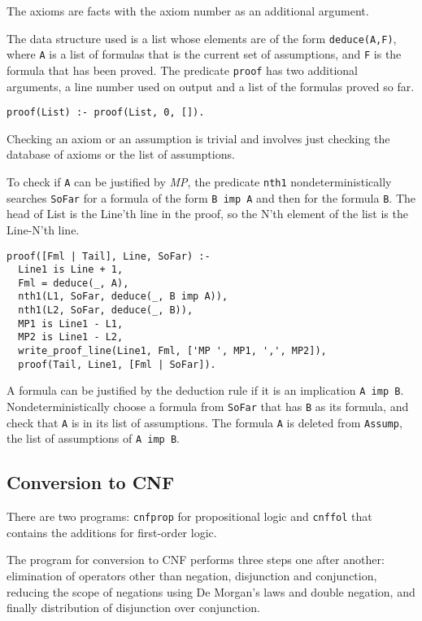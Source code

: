 \documentclass[11pt]{article}
\newcommand*{\p}[1]{\textup{\texttt{#1}}}
\begin{document}
The axioms are facts with the axiom number as an additional argument.

The data structure used is a list whose elements are of the form
\p{deduce(A,F)}, where \p{A} is a list of formulas that is the current
set of assumptions, and \p{F} is the formula that has been proved. The
predicate \p{proof} has two additional arguments, a line number used on
output and a list of the formulas proved so far.

\begin{verbatim}
proof(List) :- proof(List, 0, []).
\end{verbatim}

Checking an axiom or an assumption is trivial and involves just checking
the database of axioms or the list of assumptions.

To check if \p{A} can be justified by \emph{MP}, the predicate \p{nth1}
nondeterministically searches \p{SoFar} for a formula of the form \p{B
imp A} and then for the formula \p{B}. The head of List is the Line'th
line in the proof, so the N'th element of the list is the Line-N'th
line.

\begin{verbatim}
proof([Fml | Tail], Line, SoFar) :- 
  Line1 is Line + 1,
  Fml = deduce(_, A),
  nth1(L1, SoFar, deduce(_, B imp A)), 
  nth1(L2, SoFar, deduce(_, B)),
  MP1 is Line1 - L1,
  MP2 is Line1 - L2,
  write_proof_line(Line1, Fml, ['MP ', MP1, ',', MP2]),
  proof(Tail, Line1, [Fml | SoFar]).
\end{verbatim}

A formula can be justified by the deduction rule if it is an implication
\p{A imp B}. Nondeterministically choose a formula from \p{SoFar} that
has \p{B} as its formula, and check that \p{A} is in its list of
assumptions. The formula \p{A} is deleted from \p{Assump}, the list of
assumptions of \p{A imp B}.



\subsection{Conversion to CNF}\label{s.cnf}

There are two programs: \p{cnfprop} for propositional logic and
\p{cnffol} that contains the additions for first-order logic.

The program for conversion to CNF performs three steps one after
another: elimination of operators other than negation, disjunction and
conjunction, reducing the scope of negations using De Morgan's laws and
double negation, and finally distribution of disjunction over
conjunction.
\end{document}
